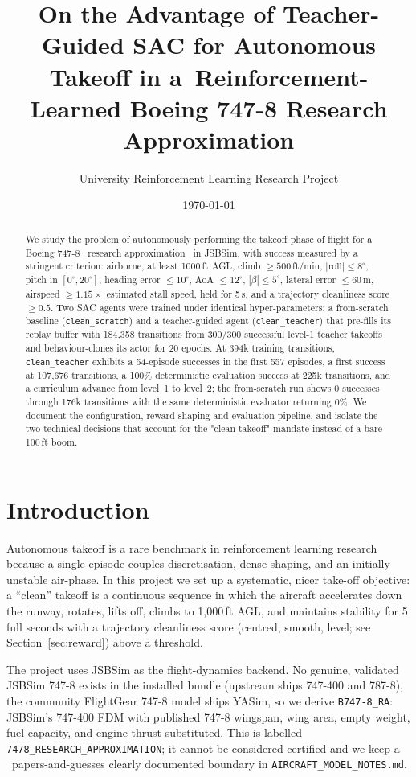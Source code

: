 \documentclass[11pt,a4paper]{article}
\title{On the Advantage of Teacher-Guided SAC for Autonomous Takeoff in a\ Reinforcement-Learned Boeing 747-8 Research Approximation}
\author{University Reinforcement Learning Research Project}
\date{\today}
\begin{document}
\maketitle
\begin{abstract}
We study the problem of autonomously performing the takeoff phase of flight for a
Boeing 747-8 ~research approximation~ in JSBSim, with success measured by a stringent
criterion: airborne, at least 1000\,ft AGL, climb $\ge 500$\,ft/min, $|\mathrm{roll}|\le 8^\circ$,
pitch in $[0^\circ,20^\circ]$, heading error $\le 10^\circ$, AoA $\le 12^\circ$, $|\beta|\le 5^\circ$,
lateral error $\le 60$\,m, airspeed $\ge 1.15\times$ estimated stall speed, held for 5\,s, and
a trajectory cleanliness score $\ge 0.5$. Two SAC agents were trained under identical
hyper-parameters: a from-scratch baseline (\texttt{clean\_scratch}) and a teacher-guided agent
(\texttt{clean\_teacher}) that pre-fills its replay buffer with 184,358 transitions from 300/300
successful level-1 teacher takeoffs and behaviour-clones its actor for 20 epochs. At 394k training
transitions, \texttt{clean\_teacher} exhibits a 54-episode successes in the first 557 episodes,
a first success at 107,676 transitions, a 100\% deterministic evaluation success at 225k transitions,
and a curriculum advance from level~1 to level~2; the from-scratch run shows 0 successes through
176k transitions with the same deterministic evaluator returning 0\%. We document the configuration,
reward-shaping and evaluation pipeline, and isolate the two technical decisions that account for
the "clean takeoff" mandate instead of a bare 100\,ft boom.
\end{abstract}

\tableofcontents

\section{Introduction}
Autonomous takeoff is a rare benchmark in reinforcement learning research because a single episode couples
discretisation, dense shaping, and an initially unstable air-phase. In this project we set up a systematic,
nicer take-off objective: a ``clean'' takeoff is a continuous sequence in which the aircraft accelerates
down the runway, rotates, lifts off, climbs to 1,000\,ft AGL, and maintains stability for 5 full seconds with a
trajectory cleanliness score (centred, smooth, level; see Section~\ref{sec:reward}) above a threshold.

The project uses JSBSim as the flight-dynamics backend. No genuine, validated JSBSim 747-8 exists in the
installed bundle (upstream ships 747-400 and 787-8), the community FlightGear 747-8 model ships YASim, so
we derive \texttt{B747-8\_RA}: JSBSim's 747-400 FDM with published 747-8 wingspan, wing area, empty weight,
fuel capacity, and engine thrust substituted. This is labelled \texttt{7478\_RESEARCH\_APPROXIMATION};
it cannot be considered certified and we keep a ~papers-and-guesses clearly documented boundary in
\texttt{AIRCRAFT\_MODEL\_NOTES.md}.
\end{document}

